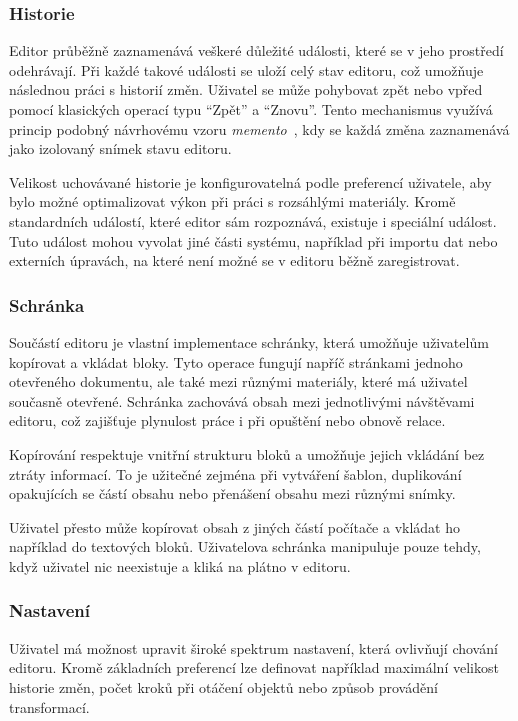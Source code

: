 \subsubsection{Historie}

Editor průběžně zaznamenává veškeré důležité události, které se v jeho prostředí odehrávají. 
Při každé takové události se uloží celý stav editoru, což umožňuje následnou práci s historií změn. 
Uživatel se může pohybovat zpět nebo vpřed pomocí klasických operací typu \enquote{Zpět} a \enquote{Znovu}. Tento mechanismus využívá princip podobný návrhovému vzoru \emph{memento}~\cite{kerievsky_2004}, kdy se každá změna zaznamenává jako izolovaný snímek stavu editoru.

Velikost uchovávané historie je konfigurovatelná podle preferencí uživatele, aby bylo možné optimalizovat výkon při práci s rozsáhlými materiály. 
Kromě standardních událostí, které editor sám rozpoznává, existuje i speciální událost.
Tuto událost mohou vyvolat jiné části systému, například při importu dat nebo externích úpravách, na které není možné se v editoru běžně zaregistrovat.

\subsubsection{Schránka}

Součástí editoru je vlastní implementace schránky, která umožňuje uživatelům kopírovat a vkládat bloky. 
Tyto operace fungují napříč stránkami jednoho otevřeného dokumentu, ale také mezi různými materiály, které má uživatel současně otevřené. 
Schránka zachovává obsah mezi jednotlivými návštěvami editoru, což zajišťuje plynulost práce i při opuštění nebo obnově relace.

Kopírování respektuje vnitřní strukturu bloků a umožňuje jejich vkládání bez ztráty informací. 
To je užitečné zejména při vytváření šablon, duplikování opakujících se částí obsahu nebo přenášení obsahu mezi různými snímky.

Uživatel přesto může kopírovat obsah z jiných částí počítače a vkládat ho například do textových bloků.
Uživatelova schránka manipuluje pouze tehdy, když uživatel nic neexistuje a kliká na plátno v editoru.

\subsubsection{Nastavení}

Uživatel má možnost upravit široké spektrum nastavení, která ovlivňují chování editoru. 
Kromě základních preferencí lze definovat například maximální velikost historie změn, počet kroků při otáčení objektů nebo způsob provádění transformací.

